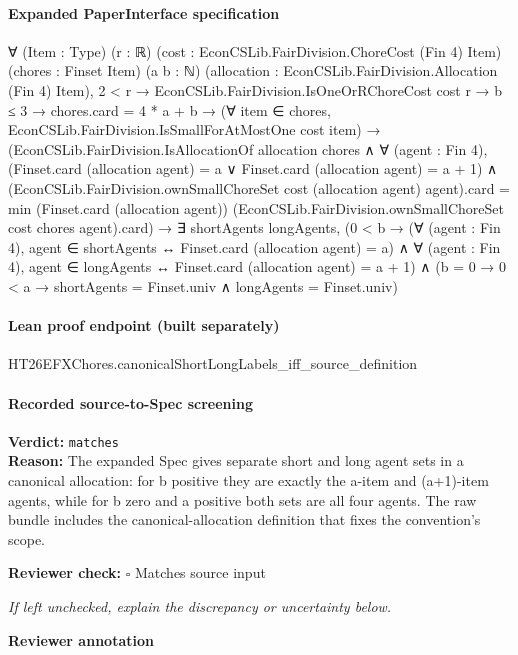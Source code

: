 \documentclass[10pt]{article}
\newcommand{\reviewerbox}{%
  \par\noindent\fbox{\parbox{0.96\linewidth}{\rule{0pt}{0.38in}}}\par
}
\newcommand{\reviewmatch}[1]{%
  \par\noindent\textbf{Reviewer check:} $\square$\; #1\par
  \noindent\emph{If left unchecked, explain the discrepancy or uncertainty below.}\par
}
\begin{document}
\paragraph{Expanded PaperInterface specification}
\begin{ReviewVerbatim}
∀ (Item : Type) (r : ℝ) (cost : EconCSLib.FairDivision.ChoreCost (Fin 4) Item) (chores : Finset Item) (a b : ℕ)
  (allocation : EconCSLib.FairDivision.Allocation (Fin 4) Item),
  2 < r →
    EconCSLib.FairDivision.IsOneOrRChoreCost cost r →
      b ≤ 3 →
        chores.card = 4 * a + b →
          (∀ item ∈ chores, EconCSLib.FairDivision.IsSmallForAtMostOne cost item) →
            (EconCSLib.FairDivision.IsAllocationOf allocation chores ∧
                ∀ (agent : Fin 4),
                  (Finset.card (allocation agent) = a ∨ Finset.card (allocation agent) = a + 1) ∧
                    (EconCSLib.FairDivision.ownSmallChoreSet cost (allocation agent) agent).card =
                      min (Finset.card (allocation agent))
                        (EconCSLib.FairDivision.ownSmallChoreSet cost chores agent).card) →
              ∃ shortAgents longAgents,
                (0 < b →
                    (∀ (agent : Fin 4), agent ∈ shortAgents ↔ Finset.card (allocation agent) = a) ∧
                      ∀ (agent : Fin 4), agent ∈ longAgents ↔ Finset.card (allocation agent) = a + 1) ∧
                  (b = 0 → 0 < a → shortAgents = Finset.univ ∧ longAgents = Finset.univ)
\end{ReviewVerbatim}

\paragraph{Lean proof endpoint (built separately)}\begin{ReviewVerbatim}
HT26EFXChores.canonicalShortLongLabels_iff_source_definition
\end{ReviewVerbatim}

\paragraph{Recorded source-to-Spec screening}
\textbf{Verdict:} \texttt{matches}
\\
\textbf{Reason:} The expanded Spec gives separate short and long agent sets in a canonical allocation: for b positive they are exactly the a-item and (a+1)-item agents, while for b zero and a positive both sets are all four agents. The raw bundle includes the canonical-allocation definition that fixes the convention's scope.
\reviewmatch{Matches source input}
\noindent\textbf{Reviewer annotation}\par
\reviewerbox
\clearpage
\hypertarget{source-claim-b7fd18b85f877d97}{}
\end{document}
